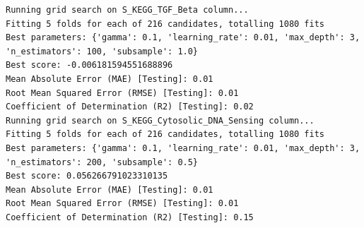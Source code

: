 \documentclass[
  letterpaper,
  DIV=11,
  numbers=noendperiod]{scrartcl}
\begin{document}
\begin{verbatim}
Running grid search on S_KEGG_TGF_Beta column...
Fitting 5 folds for each of 216 candidates, totalling 1080 fits
Best parameters: {'gamma': 0.1, 'learning_rate': 0.01, 'max_depth': 3, 'n_estimators': 100, 'subsample': 1.0}
Best score: -0.006181594551688896
Mean Absolute Error (MAE) [Testing]: 0.01
Root Mean Squared Error (RMSE) [Testing]: 0.01
Coefficient of Determination (R2) [Testing]: 0.02
Running grid search on S_KEGG_Cytosolic_DNA_Sensing column...
Fitting 5 folds for each of 216 candidates, totalling 1080 fits
Best parameters: {'gamma': 0.1, 'learning_rate': 0.01, 'max_depth': 3, 'n_estimators': 200, 'subsample': 0.5}
Best score: 0.056266791023310135
Mean Absolute Error (MAE) [Testing]: 0.01
Root Mean Squared Error (RMSE) [Testing]: 0.01
Coefficient of Determination (R2) [Testing]: 0.15
\end{verbatim}
\end{document}
